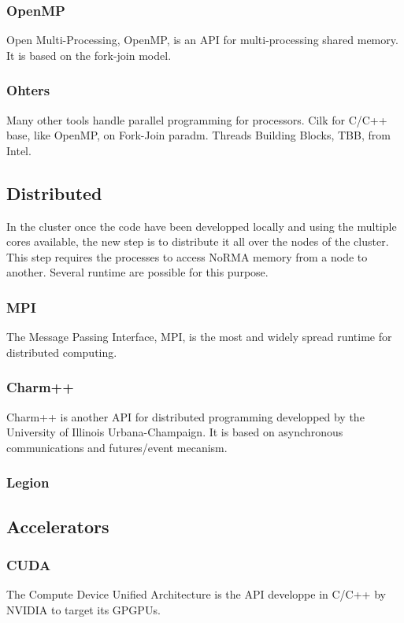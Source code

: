 \subsubsection{OpenMP}
Open Multi-Processing, OpenMP, is an API for multi-processing shared memory. 
It is based on the fork-join model.
\cite{chapman2008using,supinski2017scaling}

\subsubsection{Ohters}
Many other tools handle parallel programming for processors.
Cilk for C/C++ base, like OpenMP, on Fork-Join paradm. 
Threads Building Blocks, TBB, from Intel.

\subsection{Distributed}
In the cluster once the code have been developped locally and using the multiple cores available, the new step is to distribute it all over the nodes of the cluster. 
This step requires the processes to access NoRMA memory from a node to another. 
Several runtime are possible for this purpose.

\subsubsection{MPI}
The Message Passing Interface, MPI, is the most and widely spread runtime for distributed computing.
\cite{gropp2014using,gropp2015using}

\subsubsection{Charm++}
Charm++ is another API for distributed programming developped by the University of Illinois Urbana-Champaign.
It is based on asynchronous communications and futures/event mecanism. 

\subsubsection{Legion}

\subsection{Accelerators}
\subsubsection{CUDA}
The Compute Device Unified Architecture is the API developpe in C/C++ by NVIDIA to target its GPGPUs. 

